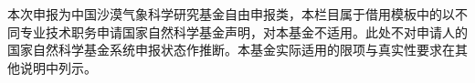 \justifying
\NSFCBodyText

本次申报为中国沙漠气象科学研究基金自由申报类，本栏目属于借用模板中的以不同专业技术职务申请国家自然科学基金声明，对本基金不适用。此处不对申请人的国家自然科学基金系统申报状态作推断。本基金实际适用的限项与真实性要求在其他说明中列示。
